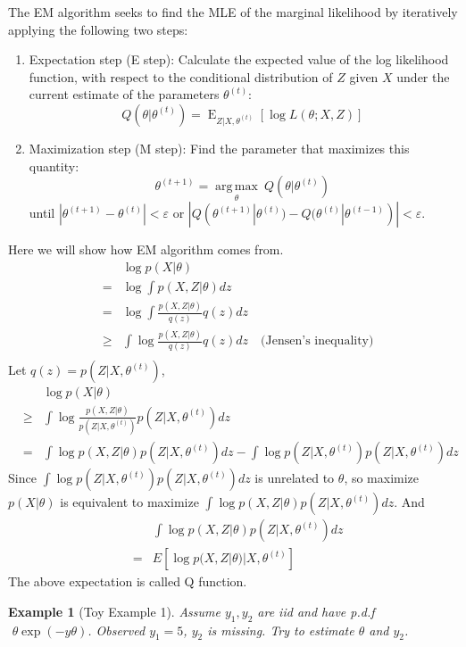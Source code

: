 \documentclass[11pt]{article}
\newtheorem{example}{Example}[section]
\begin{document}
The EM algorithm seeks to find the MLE of the marginal likelihood by iteratively applying the following two steps:
\begin{enumerate}
\item Expectation step (E step): Calculate the expected value of the log likelihood function, with respect to the conditional distribution of $Z$ given $X$ under the current estimate of the parameters $\theta^{(t)}$:
$$
        Q(\theta|\theta^{(t)}) = \operatorname{E}_{{Z}|{X},\theta^{(t)}}\left[ \log L (\theta;{X},{Z}) \right] \,
$$
\item Maximization step (M step): Find the parameter that maximizes this quantity:
$$
        \theta^{(t+1)} = \underset{\theta}{\operatorname{arg\,max}} \ Q(\theta|\theta^{(t)}) \, 
$$
until $|\theta^{(t+1)}-\theta^{(t)}| < \varepsilon$ or $|Q(\theta^{(t+1)}|\theta^{(t)})-Q(\theta^{(t)}|\theta^{(t-1)})| < \varepsilon$.
\end{enumerate}
Here we will show how EM algorithm comes from.
\begin{eqnarray*}
&& \log p(X | \theta) \\
&=& \log \int p(X, Z | \theta) dz \\
&=& \log \int \frac{p(X, Z | \theta)}{q(z)}q(z) dz \\
&\geq&\int \log \frac{p(X, Z | \theta)}{q(z)}q(z) dz \quad \mbox{(Jensen's inequality)} \\ 
\end{eqnarray*}
Let $q(z) = p(Z|X,\theta^{(t)})$, 
\begin{eqnarray*}
&& \log p(X | \theta) \\
&\geq&\int \log \frac{p(X, Z | \theta)}{ p(Z|X,\theta^{(t)})} p(Z|X,\theta^{(t)}) dz \\ 
&=& \int \log p(X, Z | \theta)p(Z|X,\theta^{(t)})dz - \int \log p(Z|X,\theta^{(t)})p(Z|X,\theta^{(t)})dz
\end{eqnarray*}
Since  $\int \log p(Z|X,\theta^{(t)})p(Z|X,\theta^{(t)})dz$ is unrelated to $\theta$, so maximize $p(X|\theta)$ is equivalent to maximize $\int \log p(X, Z | \theta)p(Z|X,\theta^{(t)})dz$. And 
\begin{eqnarray*}
&& \int \log p(X, Z | \theta)p(Z|X,\theta^{(t)})dz \\
&=& E[\log p(X, Z | \theta) | X, \theta^{(t)}]
\end{eqnarray*}
The above expectation is called Q function.
\begin{example}[Toy Example 1]
Assume $y_1, y_2$ are iid and have p.d.f $\,\, \theta\exp(-y\theta)$. Observed $y_1=5$, $y_2$ is missing. Try to estimate $\theta$ and $y_2$.
\end{example}
\end{document}
